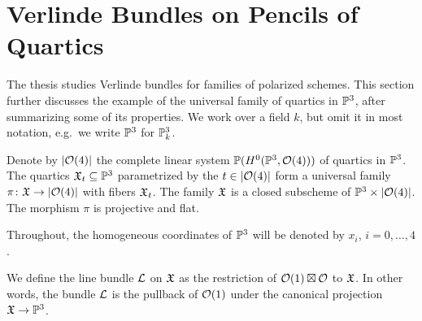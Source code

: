 \section{Verlinde Bundles on Pencils of Quartics}


\newcommand{\schemeofquartics}{\abs{\mc{O}(4)}}
\newcommand{\schemeofsections}[1]{\abs{\mc{O}(#1)}}
\newcommand{\GGr}{\mathbb G \mathrm r}

The thesis \cite{hemminghaus-verlinde-bundles} studies Verlinde bundles for
families of polarized schemes. This section further discusses the example of
the universal family of quartics in $\mathbb{P}^3$, after summarizing some of its
properties. We work over a field $k$, but omit it in most notation\footnotemark{}, e.g.\ we write $\mathbb{P}^3$ for $\mathbb{P}^3_k$.


Denote by $\schemeofquartics$ the complete linear system
$\mathbb{P}(H^0(\mathbb{P}^3, \mathcal{O}(4)))$
of quartics in $\mathbb{P}^3$. The quartics $\mathfrak{X}_t \subseteq \mathbb{P}^3$ parametrized by the $t\in\schemeofquartics$ form a universal family
$\pi \from \mf{X} \to \schemeofquartics$ with fibers $\mathfrak{X}_t$.
The family $\mathfrak{X}$ is a closed subscheme of
$\PP^3 \times \schemeofquartics$. The morphism $\pi$ is projective and flat. 


Throughout, the homogeneous coordinates of $\mathbb{P}^3$ will be denoted by
$x_i$, $i=0,\dotsc,4$.

We define the line bundle $\mathcal{L}$ on $\mathfrak{X}$ as the restriction of
$\mathcal{O}(1)\boxtimes\mathcal{O}$ to $\mathfrak{X}$. In other words\footnotemark{}, the bundle $\mathcal{L}$ is the pullback of
$\mathcal{O}(1)$ under the canonical projection $\mathfrak{X} \to \mathbb{P}^3$.

